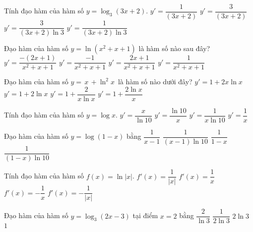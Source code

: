 \begin{ex}%
	Tính đạo hàm của hàm số $y=\log_3(3x+2)$.
	\choice
	{$y'=\dfrac{1}{(3x+2)}$}
	{$y'=\dfrac{3}{(3x+2)}$}
	{\True $y'=\dfrac{3}{(3x+2)\ln 3}$}
	{$y'=\dfrac{1}{(3x+2)\ln 3}$}
\end{ex}

\begin{ex}%
	Đạo hàm của hàm số $y=\ln \left(x^2+x+1\right)$ là hàm số nào sau đây?
	\choice
	{$y'=\dfrac{-(2x+1)}{x^2+x+1}$}
	{$y'=\dfrac{-1}{x^2+x+1}$}
	{\True $y'=\dfrac{2x+1}{x^2+x+1}$}
	{$y'=\dfrac{1}{x^2+x+1}$}
\end{ex}

\begin{ex}%
	Đạo hàm của hàm số $y=\,x\,+\ln ^2x\,$ là hàm số nào dưới đây?
	\choice
	{$y'=1+2x\ln x$}
	{$y'=1+2\ln x$}
	{$y'=1+\dfrac{2}{x\ln x}$}
	{\True $y'=1+\dfrac{2\ln x}{x}$}
\end{ex}

\begin{ex}%
	Tính đạo hàm của hàm số $y=\log x$.
	\choice
	{$y'=\dfrac{x}{\ln 10}$}
	{$y'=\dfrac{\ln 10}{x}$}
	{\True $y'=\dfrac{1}{x\ln 10}$}
	{$y'=\dfrac{1}{x}$}
\end{ex}

\begin{ex}%
	Đạo hàm của hàm số $y=\log (1-x)$ bằng
	\choice
	{$\dfrac{1}{x-1}$}
	{\True $\dfrac{1}{(x-1)\ln 10}$}
	{$\dfrac{1}{1-x}$}
	{$\dfrac{1}{(1-x)\ln 10}$}
\end{ex}

\begin{ex}%
	Tính đạo hàm của hàm số $f(x)=\ln |x|$.
	\choice
	{$f'(x)=\dfrac{1}{|x|}$}
	{\True $f'(x)=\dfrac{1}{x}$}
	{$f'(x)=-\dfrac{1}{x}$}
	{$f'(x)=-\dfrac{1}{|x|}$}
\end{ex}

\begin{ex}%
	Đạo hàm của hàm số $y=\log_3(2x-3)$ tại điểm $x=2$ bằng
	\choice
	{\True $\dfrac{2}{\ln 3}$}
	{$\dfrac{1}{2\ln 3}$}
	{$2\ln 3$}
	{$1$}
\end{ex}

